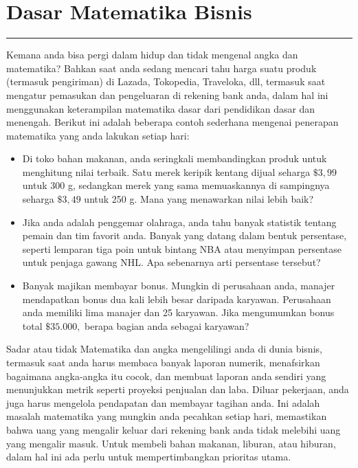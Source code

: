\documentclass[
]{book}
\providecommand{\tightlist}{%
  \setlength{\itemsep}{0pt}\setlength{\parskip}{0pt}}
\begin{document}
\hypertarget{Dasar-Matematika-Bisnis}{%
\chapter{Dasar Matematika Bisnis}\label{Dasar-Matematika-Bisnis}}

\begin{center}\rule{0.5\linewidth}{0.5pt}\end{center}

Kemana anda bisa pergi dalam hidup dan tidak mengenal angka dan matematika? Bahkan saat anda sedang mencari tahu harga suatu produk (termasuk pengiriman) di Lazada, Tokopedia, Traveloka, dll, termasuk saat mengatur pemasukan dan pengeluaran di rekening bank anda, dalam hal ini menggunakan keterampilan matematika dasar dari pendidikan dasar dan menengah. Berikut ini adalah beberapa contoh sederhana mengenai penerapan matematika yang anda lakukan setiap hari:

\begin{itemize}
\tightlist
\item
  Di toko bahan makanan, anda seringkali membandingkan produk untuk menghitung nilai terbaik. Satu merek keripik kentang dijual seharga \(\$ 3,99\) untuk 300 g, sedangkan merek yang sama memuaskannya di sampingnya seharga \(\$ 3,49\) untuk 250 g. Mana yang menawarkan nilai lebih baik?
\item
  Jika anda adalah penggemar olahraga, anda tahu banyak statistik tentang pemain dan tim favorit anda. Banyak yang datang dalam bentuk persentase, seperti lemparan tiga poin untuk bintang NBA atau menyimpan persentase untuk penjaga gawang NHL. Apa sebenarnya arti persentase tersebut?
\item
  Banyak majikan membayar bonus. Mungkin di perusahaan anda, manajer mendapatkan bonus dua kali lebih besar daripada karyawan. Perusahaan anda memiliki lima manajer dan 25 karyawan. Jika mengumumkan bonus total \(\$ 35.000,\) berapa bagian anda sebagai karyawan?
\end{itemize}

Sadar atau tidak Matematika dan angka mengelilingi anda di dunia bisnis, termasuk saat anda harus membaca banyak laporan numerik, menafsirkan bagaimana angka-angka itu cocok, dan membuat laporan anda sendiri yang menunjukkan metrik seperti proyeksi penjualan dan laba. Diluar pekerjaan, anda juga harus mengelola pendapatan dan membayar tagihan anda. Ini adalah masalah matematika yang mungkin anda pecahkan setiap hari, memastikan bahwa uang yang mengalir keluar dari rekening bank anda tidak melebihi uang yang mengalir masuk. Untuk membeli bahan makanan, liburan, atau hiburan, dalam hal ini ada perlu untuk mempertimbangkan prioritas utama.
\end{document}
